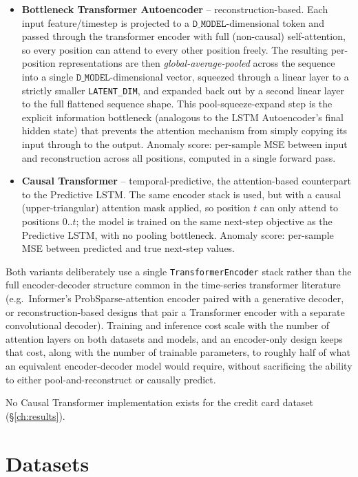 \begin{itemize}
  \item \textbf{Bottleneck Transformer Autoencoder} -- reconstruction-based. Each input feature/timestep is projected to a $\texttt{D\_MODEL}$-dimensional token and passed through the transformer encoder with full (non-causal) self-attention, so every position can attend to every other position freely. The resulting per-position representations are then \emph{global-average-pooled} across the sequence into a single $\texttt{D\_MODEL}$-dimensional vector, squeezed through a linear layer to a strictly smaller \texttt{LATENT\_DIM}, and expanded back out by a second linear layer to the full flattened sequence shape. This pool-squeeze-expand step is the explicit information bottleneck (analogous to the LSTM Autoencoder's final hidden state) that prevents the attention mechanism from simply copying its input through to the output. Anomaly score: per-sample MSE between input and reconstruction across all positions, computed in a single forward pass.
  \item \textbf{Causal Transformer} -- temporal-predictive, the attention-based counterpart to the Predictive LSTM. The same encoder stack is used, but with a causal (upper-triangular) attention mask applied, so position $t$ can only attend to positions $0..t$; the model is trained on the same next-step objective as the Predictive LSTM, with no pooling bottleneck. Anomaly score: per-sample MSE between predicted and true next-step values.
\end{itemize}

Both variants deliberately use a single \texttt{TransformerEncoder} stack rather than the full encoder-decoder structure common in the time-series transformer literature (e.g.\ Informer's ProbSparse-attention encoder paired with a generative decoder, or reconstruction-based designs that pair a Transformer encoder with a separate convolutional decoder). Training and inference cost scale with the number of attention layers on both datasets and models, and an encoder-only design keeps that cost, along with the number of trainable parameters, to roughly half of what an equivalent encoder-decoder model would require, without sacrificing the ability to either pool-and-reconstruct or causally predict.

No Causal Transformer implementation exists for the credit card dataset (\S\ref{ch:results}).

\section{Datasets}
\label{sec:datasets}

